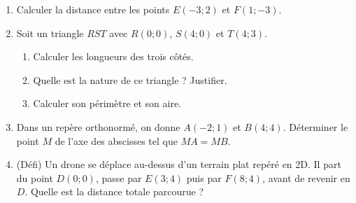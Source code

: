 \documentclass[11pt]{article}
\begin{document}
\begin{exercice}
\begin{enumerate}
    \item Calculer la distance entre les points $E(-3 ; 2)$ et $F(1 ; -3)$.
    \item Soit un triangle $RST$ avec $R(0;0)$, $S(4;0)$ et $T(4;3)$.
    \begin{enumerate}
        \item Calculer les longueurs des trois côtés.
        \item Quelle est la nature de ce triangle ? Justifier.
        \item Calculer son périmètre et son aire.
    \end{enumerate}
    \item Dans un repère orthonormé, on donne $A(-2;1)$ et $B(4;4)$. Déterminer le point $M$ de l'axe des abscisses tel que $MA = MB$.
    \item (Défi) Un drone se déplace au-dessus d'un terrain plat repéré en 2D. Il part du point $D(0;0)$, passe par $E(3;4)$ puis par $F(8;4)$, avant de revenir en $D$. Quelle est la distance totale parcourue ?
\end{enumerate}
\end{exercice}
\end{document}
